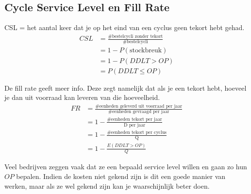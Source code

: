 \subsection{Cycle Service Level en Fill Rate}
\label{sub:Cycle Service Level en Fill Rate}
CSL = het aantal keer dat je op het eind van een cyclus geen tekort hebt gehad.
\begin{align*}
    CSL &= \frac{\text{\# bestelcycli zonder tekort}}{\text{\# bestelcycli}} \\
    &= 1 - P(\text{stockbreuk}) \\
    &= 1 - P(DDLT > OP)\\
    &= P(DDLT \le OP)
\end{align*}

De fill rate geeft meer info. Deze zegt namelijk dat als je een tekort hebt, hoeveel je dan uit voorraad kan leveren van die hoeveelheid.
\begin{align*}
    FR &= \frac{\text{\# eenheden geleverd uit voorraad per jaar}}{\text{\# eenheden gevraagd per jaar}} \\
    &= 1 - \frac{\text{\# eenheden tekort per jaar}}{\text{D per jaar}} \\
    &= 1 - \frac{\text{\# eenheden tekort per cyclus}}{\text{Q}} \\
    &= 1 - \frac{E(DDLT > OP)}{Q}
\end{align*}

Veel bedrijven zeggen vaak dat ze een bepaald service level willen en gaan zo hun $OP$ bepalen. Indien de kosten niet gekend zijn is dit een goede manier van werken, maar als ze wel gekend zijn kan je waarschijnlijk beter doen.

